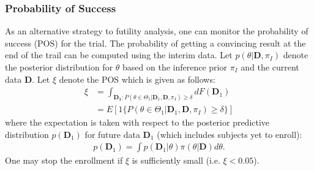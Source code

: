 \documentclass[12pt]{article}
\begin{document}
\subsubsection*{Probability of Success}
As an alternative strategy to futility analysis, one can monitor the probability of success (POS) for the trial. The probability of getting a convincing result at the end of the trail can be computed using the interim data. Let $p(\theta|\mathbf{D}, \pi_{I})$ denote the posterior distribution for $\theta$ based on the inference prior $ \pi_{I}$ and the current data $\mathbf{D}$. Let $\xi$ denote the POS which is given as follows:
\begin{align*}
\xi&=\int_{\mathbf{D_1}:P(\theta\in\Theta_1|\mathbf{D}_1,\mathbf{D}, \pi_{I})\geq \delta}dF(\mathbf{D}_1)\\
&=E[1\{P(\theta\in\Theta_1|\mathbf{D}_1,\mathbf{D}, \pi_{I})\geq \delta\}]
\end{align*}
where the expectation is taken with respect to the posterior predictive distribution $p(\mathbf{D}_1)$ for future data $\mathbf{D}_1$ (which includes subjects yet to enroll):
\begin{align*}
p(\mathbf{D}_1)=\int p(\mathbf{D}_1|\theta) \pi(\theta|\mathbf{D})d\theta.
\end{align*}
One may stop the enrollment if $\xi$ is sufficiently small (i.e. $\xi<0.05$).
\end{document}
